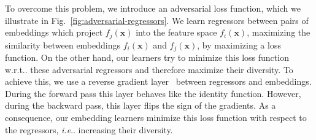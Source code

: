 \documentclass[10pt,journal,compsoc]{IEEEtran}
\makeatletter
\DeclareRobustCommand\onedot{\futurelet\@let@token\@onedot}
\def\@onedot{\ifx\@let@token.\else.\null\fi\xspace}
\def\ie{\emph{i.e}\onedot} \def\Ie{\emph{I.e}\onedot}
\def\wrt{w.r.t\onedot} \def\dof{d.o.f\onedot}
\makeatother
\begin{document}
To overcome this problem, we introduce an adversarial loss function, which we illustrate in Fig.~\ref{fig:adversarial-regressors}.
We learn regressors between pairs of embeddings 
which project $f_j(\boldsymbol{x})$ into the feature space $f_i(\boldsymbol{x})$, maximizing
the similarity between embeddings $f_i(\boldsymbol{x})$ and $f_j(\boldsymbol{x})$, by maximizing a loss function. On the other hand, our learners try to minimize this loss function \wrt these adversarial regressors and therefore maximize their diversity.
To achieve this, 
we use a reverse gradient layer~\cite{ganin2016domain} between regressors and embeddings. 
During the forward pass this layer behaves like the identity function.
However, during the backward pass, this layer flips the sign of the
gradients. As a consequence, our embedding learners minimize this loss function with respect to the regressors, \ie increasing their diversity.
\end{document}
